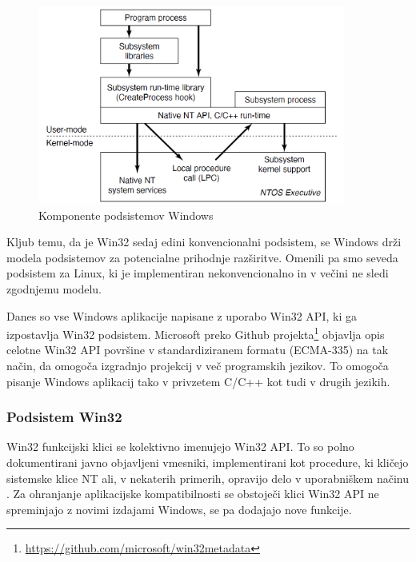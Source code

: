 \documentclass[a4paper,12pt,openright]{book}
\begin{document}
\begin{figure}[h!]
	\begin{center}
		\includegraphics[width=0.9\textwidth]{images/windows_subsystems_components.png}
	\end{center}
	\caption{Komponente podsistemov Windows \cite{Tanenbaum_Bos_2023}}
	\label{fig:windows_subsystems_components}
\end{figure}

Kljub temu, da je Win32 sedaj edini konvencionalni podsistem, se Windows drži modela podsistemov za potencialne prihodnje razširitve.
Omenili pa smo seveda podsistem za Linux, ki je implementiran nekonvencionalno in v večini ne sledi zgodnjemu modelu.

Danes so vse Windows aplikacije napisane z uporabo Win32 API, ki ga izpostavlja Win32 podsistem.
Microsoft preko Github projekta\footnote{\url{https://github.com/microsoft/win32metadata}} objavlja opis celotne Win32 API površine v standardiziranem formatu (ECMA-335) na tak način, da omogoča izgradnjo projekcij v več programskih jezikov.
To omogoča pisanje Windows aplikacij tako v privzetem C/C++ kot tudi v drugih jezikih.

\subsubsection{Podsistem Win32}

Win32 funkcijski klici se kolektivno imenujejo Win32 API.
To so polno dokumentirani javno objavljeni vmesniki, implementirani kot procedure, ki kličejo sistemske klice NT ali, v nekaterih primerih, opravijo delo v uporabniškem načinu \cite{Tanenbaum_Bos_2023}.
Za ohranjanje aplikacijske kompatibilnosti se obstoječi klici Win32 API ne spreminjajo z novimi izdajami Windows, se pa dodajajo nove funkcije.
\end{document}
